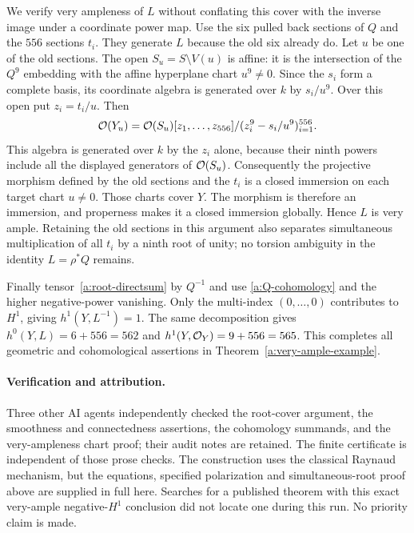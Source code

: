 We verify very ampleness of $L$ without conflating this cover with
the inverse image under a coordinate power map. Use the six pulled
back sections of $Q$ and the $556$ sections $t_i$. They generate $L$
because the old six already do. Let $u$ be one of the old sections.
The open $S_u=S\setminus V(u)$ is affine: it is the intersection of
the $Q^9$ embedding with the affine hyperplane chart $u^9\ne0$.
Since the $s_i$ form a complete basis, its coordinate algebra is
generated over $k$ by $s_i/u^9$. Over this open put $z_i=t_i/u$.
Then
\[
 \mathcal O(Y_u)=\mathcal O(S_u)[z_1,\ldots,z_{556}]
                   /(z_i^9-s_i/u^9)_{i=1}^{556}.
\]
This algebra is generated over $k$ by the $z_i$ alone, because their
ninth powers include all the displayed generators of $\mathcal O(S_u)$.
Consequently the projective morphism defined by the old sections and
the $t_i$ is a closed immersion on each target chart $u\ne0$.
Those charts cover $Y$. The morphism is therefore an immersion,
and properness makes it a closed immersion globally. Hence $L$ is
very ample. Retaining the old sections in this argument also
separates simultaneous multiplication of all $t_i$ by a ninth root
of unity; no torsion ambiguity in the identity $L=\rho^*Q$ remains.

Finally tensor~\eqref{a:root-directsum} by $Q^{-1}$ and use
\eqref{a:Q-cohomology} and the higher negative-power vanishing.
Only the multi-index $(0,\ldots,0)$ contributes to $H^1$, giving
$h^1(Y,L^{-1})=1$. The same decomposition gives
$h^0(Y,L)=6+556=562$ and $h^1(Y,\mathcal O_Y)=9+556=565$.
This completes all geometric and cohomological assertions in
Theorem~\ref{a:very-ample-example}.

\paragraph{Verification and attribution.}
Three other AI agents independently checked the root-cover argument,
the smoothness and connectedness assertions, the cohomology summands,
and the very-ampleness chart proof; their audit notes are retained.
The finite certificate is independent of those prose checks. The
construction uses the classical Raynaud mechanism, but the equations,
specified polarization and simultaneous-root proof above are supplied
in full here. Searches for a published theorem with this exact
very-ample negative-$H^1$ conclusion did not locate one during this
run. No priority claim is made.

